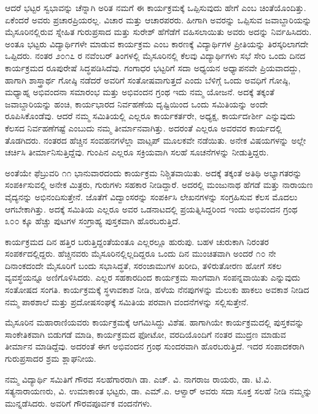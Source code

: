 {ಆದರೆ ಭಟ್ಟರ ಸ್ವಭಾವನ್ನು ಚೆನ್ನಾಗಿ ಅರಿತ ನಮಗೆ ಈ ಕಾರ್ಯಕ್ರಮಕ್ಕೆ ಒಪ್ಪಿಸುವುದು ಹೇಗೆ ಎಂಬ ಚಿಂತೆಯೊಂದಿತ್ತು. ಏಕೆಂದರೆ ಅವರು ಪ್ರಚಾರಪ್ರಿಯರಲ್ಲ. ವಿಚಾರ ಮತ್ತು ಆಚಾರಪರರು. ಹೀಗಾಗಿ ಅವರನ್ನು ಒಪ್ಪಿಸುವ ಜವಾಬ್ದಾರಿಯನ್ನು ಮೈಸೂರಿನಲ್ಲಿರುವ ಸ್ನೇಹಿತ ಗುರುಪ್ರಸಾದ ಮತ್ತು ಸುರೇಶ್ ಹೆಗೆಡೆಗೆ ವಹಿಸಲಾಯಿತು ಅವರು ಅದನ್ನು ನಿರ್ವಹಿಸಿದರು. ಅಂತೂ ಭಟ್ಟರು ವಿದ್ಯಾರ್ಥಿಗಳೇ ಮಾಡುವ ಕಾರ್ಯಕ್ರಮ ಎಂಬ ಕಾರಣಕ್ಕೆ ವಿದ್ಯಾರ್ಥಿಗಳ ಪ್ರೀತಿಯನ್ನು ತಿರಸ್ಕರಿಲಾಗದೇ ಒಪ್ಪಿದರು. ನಂತರ ೨೦೧೭ ರ ನವೆಂಬರ್ ತಿಂಗಳಲ್ಲಿ ಮೈಸೂರಿನಲ್ಲಿ ಕೆಲವು ವಿದ್ಯಾರ್ಥಿಗಳು ಸಭೆ ಸೇರಿ ಒಂದು ದಿನದ ಕಾರ್ಯಕ್ರಮದ ರೂಪುರೇಷೆ ಸಿದ್ಧಪಡಿಸಿದೆವು. ಗಂಗಾಧರ ಭಟ್ಟರಿಗೆ ಸದಾ ಅಧ್ಯಯನ ಅಧ್ಯಾಪನವೇ ಪ್ರಿಯವಾದದ್ದು, ಹಾಗಾಗಿ ಶಾಸ್ತ್ರಾರ್ಥ ಗೋಷ್ಠಿ ನಡೆದರೆ ಅವರಿಗೆ ಸಂತೋಷವಾಗುತ್ತದೆ ಎಂದು ಬೆಳಿಗ್ಗೆ ಒಂದು ಅವಧಿಗೆ ಗೋಷ್ಠಿ, ಮಧ್ಯಾಹ್ನ ಅಭಿವಂದನಾ ಸಮಾರಂಭ ಮತ್ತು ಅಭಿವಂದನ ಗ್ರಂಥ ಇದು ನಮ್ಮ ಯೋಜನೆ. ಅದಕ್ಕೆ ತಕ್ಕಂತೆ ಜವಾಬ್ದಾರಿಯನ್ನು ಹಂಚಿ, ಕಾರ್ಯಭಾರದ ನಿರ್ವಹಣೆಯ ದೃಷ್ಟಿಯಿಂದ ಒಂದು ಸಮಿತಿಯನ್ನು ಅಂದೇ ರೂಪಿಸಿಕೊಂಡೆವು. ಆದರೆ ನಮ್ಮ ಸಮಿತಿಯಲ್ಲಿ ಎಲ್ಲರೂ ಕಾರ್ಯಕರ್ತರೇ, ಅಧ್ಯಕ್ಷ, ಕಾರ್ಯದrರ್ಶೀ ಎನ್ನುವುದು ಕೆಲಸದ ನಿರ್ವಹಣೆಗಷ್ಟೆ ಎಂಬುದು ನಮ್ಮ ತೀರ್ಮಾನವಾಗಿತ್ತು. ಅದರಂತೆ ಎಲ್ಲರೂ ಅವರವರ ಕಾರ್ಯದಲ್ಲಿ ತೊಡಗಿದರು. ನಂತರದ ಹೆಚ್ಚಿನ ಸಂವಹನಗಳೆಲ್ಲಾ ವಾಟ್ಸಪ್ ಮೂಲಕವೇ ನಡೆಯಿತು. ಅನೇಕ ವಿಷಯಗಳನ್ನು ಅಲ್ಲೇ ಚರ್ಚಿಸಿ ತೀರ್ಮಾನಿಸುತ್ತಿದ್ದೆವು. ಗುಂಪಿನ ಎಲ್ಲರೂ ಸಕ್ರಿಯ\-ವಾಗಿ ಸಲಹೆ ಸೂಚನೆಗಳನ್ನು ನೀಡುತ್ತಿದ್ದರು.

ಅಂತೆಯೇ ಫೆಬ್ರುವರಿ ೧೧ ಭಾನುವಾರದಂದು ಕಾರ್ಯಕ್ರಮ ನಿಶ್ಚಿತವಾಯಿತು. ಅದಕ್ಕೆ ತಕ್ಕಂತೆ ಅತಿಥಿ ಅಭ್ಯಾಗತರನ್ನು ಸಂಪರ್ಕಿಸುವಲ್ಲಿ ಅನೇಕ ಮಿತ್ರರು, ಗುರುಗಳು ಸಹಕಾರ ನೀಡಿದ್ದಾರೆ. ಅದರಲ್ಲಿ ಮಂಜುನಾಥ ಹೆಗಡೆ ಮತ್ತು ನಾರಾಯಣ ವೈದ್ಯನನ್ನು ಅಭಿನಂದಿಸುತ್ತೇನೆ. ಜೊತೆಗೆ ವಿದ್ವಾಂಸರನ್ನು ಸಂಪರ್ಕಿಸಿ ಲೇಖನಗಳನ್ನು ಸಂಗ್ರಹಿಸುವ ಕೆಲಸ ಮೊದಲು ಆಗಬೇಕಾಗಿತ್ತು. ಅದಕ್ಕೆ ಸಮಿತಿಯ ಎಲ್ಲರೂ ಅವರ ಒಡನಾಟದಲ್ಲಿ ಪ್ರಯತ್ನಿಸಿದ್ದರಿಂದ ಇಂದು ಅಭಿವಂದನ ಗ್ರಂಥ ೩೦೦ ಕ್ಕೂ ಹೆಚ್ಚು ಪುಟಗಳ ಸಂಗ್ರಾಹ್ಯ ಪುಸ್ತಕವಾಗಿ ಹೊರಬರುತ್ತಿದೆ.

ಕಾರ್ಯಕ್ರಮದ ದಿನ ಹತ್ತಿರ ಬರುತ್ತಿದ್ದಂತೆಯಂತೂ ಎಲ್ಲರಲ್ಲೂ ಹುರುಪು. ಬಹಳ ಚುರುಕಾಗಿ ನಿರಂತರ ಸಂಪರ್ಕದಲ್ಲಿದ್ದರು. ಹೆಚ್ಚಿನವರು ಮೈಸೂರಿನಲ್ಲಿಲ್ಲದಿದ್ದರೂ ಒಂದು ದಿನ ಮುಂಚಿತವಾಗಿ ಅಂದರೆ ೧೦ ನೇ ದಿನಾಂಕದಂದೇ ಮೈಸೂರಿಗೆ ಬಂದು ಸಭಾಸಿದ್ಧತೆ, ಸರಂಜಾಮುಗಳ ಖರೀದಿ, ತಳಿರುತೋರಣ ಹೋಗೆ ಸಕಲ ವ್ಯವಸ್ಥೆಯನ್ನೂ ಅಣಿಗೊಳಿಸಿದರು. ಎಲ್ಲರ ಸಹಕಾರದಿಂದ ಕಾರ್ಯಕ್ರಮ ಸಾಂಗವಾಗಿ ಸಂಪನ್ನ\-ವಾಯಿತು ಎನ್ನುವುದು ಸಂತೋಷದ ಸಂಗತಿ. ಕಾರ್ಯಕ್ರಮಕ್ಕೆ ಸ್ಥಳಾವಕಾಶ ನೀಡಿ, ಹಳೆಯ ನೆನಪುಗಳನ್ನು ಮೆಲುಕು ಹಾಕಲು ಅವಕಾಶ ನೀಡಿದ ನಮ್ಮ ಪಾಠಶಾಲೆ ಮತ್ತು ಪ್ರದೋಷಸಂಘಕ್ಕೆ ಸಮಿತಿಯ ಪರವಾಗಿ ವಂದನೆಗಳನ್ನು ಸಲ್ಲಿಸುತ್ತೇನೆ.

ಮೈಸೂರಿನ ಮಹಾರಾಣಿಯವರು ಕಾರ್ಯಕ್ರಮಕ್ಕೆ ಆಗಮಿಸಿದ್ದು ವಿಶೆಷ. ಹಾಗಾಗಿಯೇ ಕಾರ್ಯಕ್ರಮದಲ್ಲಿ ಪುಸ್ತಕವನ್ನು ಸಾಂಕೇತಿಕವಾಗಿ ಬಿಡುಗಡೆ ಮಾಡಿ, ಕಾರ್ಯಕ್ರಮದ ಫೋಟೋ, ವರದಿಯೊಂದಿಗೆ ನಂತರ ಮುದ್ರಣ ಮಾಡುವ ತೀರ್ಮಾನ ಮಾಡಿದ್ದೆವು. ಅದರಂತೆ ಈಗ ಅಭಿವಂದನ ಗ್ರಂಥ ಸುಂದರವಾಗಿ ಹೊರಬರುತ್ತಿದೆ. ಇದರ ಸಂಪಾದಕರಾಗಿ ಗುರುಪ್ರಸಾದರ ಶ್ರಮ ಶ್ಲಾಘನೀಯ.

ನಮ್ಮ ವಿದ್ಯಾರ್ಥಿ ಸಮಿತಿಗೆ ಗೌರವ ಸಲಹೆಗಾರರಾಗಿ ಡಾ. ಎಚ್. ವಿ. ನಾಗರಾಜ ರಾಯರು, ಡಾ. ಟಿ.ವಿ. ಸತ್ಯನಾರಾಯಣರು, ವಿ. ಉಮಾಕಾಂತ ಭಟ್ಟರು, ಡಾ. ಎಮ್.ಎ. ಆಳ್ವಾರ್ ಅವರು ಸದಾ ಸೂಕ್ತ ಸಲಹೆ ನೀಡಿ ನಮ್ಮನ್ನು ಮುನ್ನಡೆಸಿದರು. ಅವರಿಗೆ ಗೌರವಪೂರ್ವಕ ವಂದನೆಗಳು.
\newpage

}
